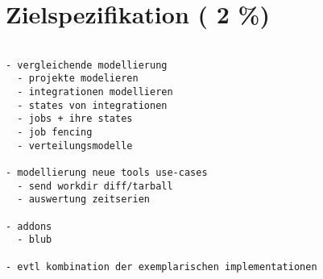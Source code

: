 \chapter{Zielspezifikation ( 2 \%)}

\begin{verbatim}

- vergleichende modellierung
  - projekte modelieren
  - integrationen modellieren
  - states von integrationen
  - jobs + ihre states
  - job fencing
  - verteilungsmodelle

- modellierung neue tools use-cases
  - send workdir diff/tarball
  - auswertung zeitserien

- addons
  - blub

- evtl kombination der exemplarischen implementationen


\end{verbatim}



